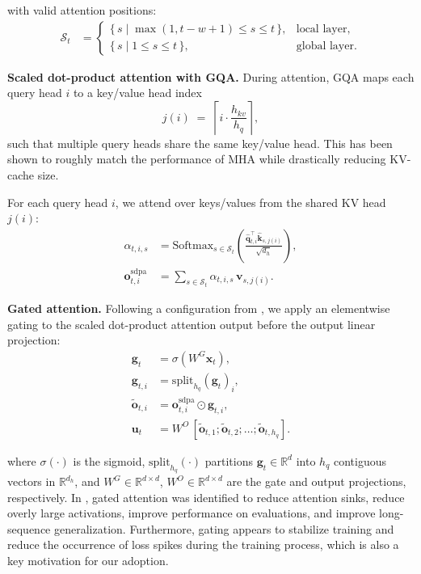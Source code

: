 \documentclass{article}
\begin{document}
with valid attention positions:
\begin{align}
\mathcal{S}_t &=
\begin{cases}
\{\,s \mid \max(1,t-w+1)\le s \le t\,\}, & \text{local layer},\\
\{\,s \mid 1 \le s \le t\,\}, & \text{global layer}.
\end{cases} \tag{8}
\end{align}

\vspace{0.25em}
\noindent\textbf{Scaled dot-product attention with GQA.}
During attention, GQA maps each query head $i$ to a key/value head index
\[
j(i) \;=\; \left\lceil i\cdot \frac{h_{kv}}{h_q} \right\rceil,
\]
such that multiple query heads share the same key/value head. This has been shown to roughly match the performance of MHA while drastically reducing KV-cache size. 

For each query head $i$, we attend over keys/values from the shared KV head $j(i)$:
\begin{align}
\alpha_{t,i,s} &=
\mathrm{Softmax}_{s\in \mathcal{S}_t}
\left(
\frac{\widehat{\mathbf{q}}_{t,i}^{\top}\widehat{\mathbf{k}}_{s,j(i)}}{\sqrt{d_h}}
\right), \tag{9}\\
\mathbf{o}^{\mathrm{sdpa}}_{t,i} &= \sum_{s\in \mathcal{S}_t} \alpha_{t,i,s}\,\mathbf{v}_{s,j(i)}. \tag{10}
\end{align}

\vspace{0.25em}
\noindent\textbf{Gated attention.}
Following a configuration from \cite{qiu2025gatedattentionlargelanguage}, we apply an elementwise gating to the scaled dot-product attention output before the output linear projection:
\begin{align}
\mathbf{g}_t &= \sigma\!\left(W^{G}\mathbf{x}_t\right), \tag{11}\\
\mathbf{g}_{t,i} &= \mathrm{split}_{h_q}\!\left(\mathbf{g}_t\right)_{i}, \tag{12}\\
\widetilde{\mathbf{o}}_{t,i} &= \mathbf{o}^{\mathrm{sdpa}}_{t,i}\odot \mathbf{g}_{t,i}, \tag{13}\\
\mathbf{u}_t &= W^{O}\,[\widetilde{\mathbf{o}}_{t,1};\widetilde{\mathbf{o}}_{t,2};\dots;\widetilde{\mathbf{o}}_{t,h_q}]. \tag{14}
\end{align}

where $\sigma(\cdot)$ is the sigmoid, $\mathrm{split}_{h_q}(\cdot)$ partitions $\mathbf{g}_t\in\mathbb{R}^{d}$ into $h_q$ contiguous vectors in $\mathbb{R}^{d_h}$, and $W^{G}\in\mathbb{R}^{d\times d}$, $W^{O}\in\mathbb{R}^{d\times d}$ are the gate and output projections, respectively. In \cite{qiu2025gatedattentionlargelanguage}, gated attention was identified to reduce attention sinks, reduce overly large activations, improve performance on evaluations, and improve long-sequence generalization. Furthermore, gating appears to stabilize training and reduce the occurrence of loss spikes during the training process, which is also a key motivation for our adoption.
\end{document}
